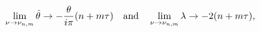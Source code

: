 \begin{equation}
\lim_{\nu \rightarrow \nu _{n,m}}\hat{\theta}\rightarrow -\frac{\theta }{%
i\pi }(n+m\tau )\quad \text{and}\quad \lim_{\nu \rightarrow \nu
_{n,m}}\lambda \rightarrow -2(n+m\tau ),
\end{equation}%
